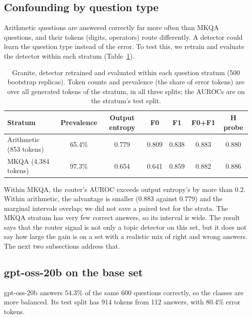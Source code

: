 \documentclass[11pt]{article}
\newcommand{\FZ}{\textsf{F0}}
\newcommand{\FO}{\textsf{F1}}
\newcommand{\FZO}{\textsf{F0+F1}}
\newcommand{\Hs}{\textsf{H}}
\begin{document}
\subsection{Confounding by question type}

Arithmetic questions are answered correctly far more often than MKQA questions, and their tokens (digits, operators) route differently.
A detector could learn the question type instead of the error.
To test this, we retrain and evaluate the detector within each stratum (Table~\ref{tab:strata}).

\begin{table}[t]
\centering
\small
\caption{Granite, detector retrained and evaluated within each question stratum (500 bootstrap replicas). Token counts and prevalence (the share of error tokens) are over all generated tokens of the stratum, in all three splits; the AUROCs are on the stratum's test split.}
\label{tab:strata}
\begin{tabular}{lcccccc}
\toprule
Stratum & Prevalence & Output entropy & \FZ{} & \FO{} & \FZO{} & \Hs{} probe \\
\midrule
Arithmetic (853 tokens) & 65.4\% & 0.779 & 0.809 & 0.838 & 0.883 & 0.880 \\
MKQA (4,384 tokens) & 97.3\% & 0.654 & 0.641 & 0.859 & 0.882 & 0.886 \\
\bottomrule
\end{tabular}
\end{table}

Within MKQA, the router's AUROC exceeds output entropy's by more than 0.2.
Within arithmetic, the advantage is smaller (0.883 against 0.779) and the marginal intervals overlap; we did not save a paired test for the strata.
The MKQA stratum has very few correct answers, so its interval is wide.
The result says that the router signal is not only a topic detector on this set, but it does not say how large the gain is on a set with a realistic mix of right and wrong answers.
The next two subsections address that.

\subsection{gpt-oss-20b on the base set}

gpt-oss-20b answers 54.3\% of the same 600 questions correctly, so the classes are more balanced.
Its test split has 914 tokens from 112 answers, with 80.4\% error tokens.
\end{document}
